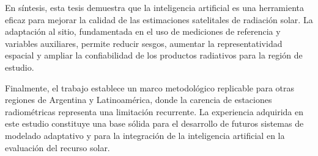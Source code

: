 \documentclass[letterpaper,12pt, twoside]{report}
\makeatletter
\let\newtitle\@title
\providecommand{\DIFdeltex}[1]{{\protect\color{red} \scriptsize #1}} %
\providecommand{\DIFaddbegin}{} %
\providecommand{\DIFaddend}{} %
\providecommand{\DIFdelbegin}{} %
\providecommand{\DIFdelend}{} %
\providecommand{\DIFdel}[1]{\texorpdfstring{\DIFdeltex{#1}}{}} %
\newcommand{\DIFscaledelfig}{0.5}
\newlength{\DIFdelgraphicswidth} %
\newlength{\DIFdelgraphicsheight} %
\newcommand{\DIFaddincludegraphics}[2][]{{\color{blue}\fbox{\DIFOincludegraphics[#1]{#2}}}} %
\newcommand{\DIFdelincludegraphics}[2][]{%
\sbox{\DIFdelgraphicsbox}{\DIFOincludegraphics[#1]{#2}}%
\settoboxwidth{\DIFdelgraphicswidth}{\DIFdelgraphicsbox} %
\settoboxtotalheight{\DIFdelgraphicsheight}{\DIFdelgraphicsbox} %
\scalebox{\DIFscaledelfig}{%
\parbox[b]{\DIFdelgraphicswidth}{\usebox{\DIFdelgraphicsbox}\\[-\baselineskip] \rule{\DIFdelgraphicswidth}{0em}}\llap{\resizebox{\DIFdelgraphicswidth}{\DIFdelgraphicsheight}{%
\setlength{\unitlength}{\DIFdelgraphicswidth}%
\begin{picture}(1,1)%
\thicklines\linethickness{2pt} %
{\color[rgb]{1,0,0}\put(0,0){\framebox(1,1){}}}%
{\color[rgb]{1,0,0}\put(0,0){\line( 1,1){1}}}%
{\color[rgb]{1,0,0}\put(0,1){\line(1,-1){1}}}%
\end{picture}%
}\hspace*{3pt}}} %
} %
\DeclareRobustCommand{\DIFaddbegin}{\DIFOaddbegin \let\includegraphics\DIFaddincludegraphics} %
\DeclareRobustCommand{\DIFaddend}{\DIFOaddend \let\includegraphics\DIFOincludegraphics} %
\DeclareRobustCommand{\DIFdelbegin}{\DIFOdelbegin \let\includegraphics\DIFdelincludegraphics} %
\DeclareRobustCommand{\DIFdelend}{\DIFOaddend \let\includegraphics\DIFOincludegraphics} %
\makeatother
\begin{document}
\DIFdel{En síntesis, esta tesis demuestra que la inteligencia artificial es una herramienta eficaz para mejorar la calidad de las estimaciones satelitales de radiación solar. La adaptación al sitio, fundamentada en el uso de mediciones de referencia y variables auxiliares, permite reducir sesgos, aumentar la representatividad espacial y ampliar la confiabilidad de los productos radiativos para la región de estudio.
}%

\DIFdel{Finalmente, el trabajo establece un marco metodológico replicable para otras regiones de Argentina y Latinoamérica, donde la carencia de estaciones radiométricas representa una limitación recurrente. La experiencia adquirida en este estudio constituye una base sólida para el desarrollo de futuros sistemas de modelado adaptativo y para la integración de la inteligencia artificial en la evaluación del recurso solar.
}%

\DIFdelend \DIFaddbegin  \DIFaddend %
\DIFdelbegin %

\end{document}
